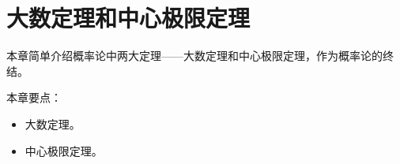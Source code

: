 \chapter{大数定理和中心极限定理}

本章简单介绍概率论中两大定理——大数定理和中心极限定理，作为概率论的终结。

本章要点：
\begin{itemize}
    \item 大数定理。
    \item 中心极限定理。
\end{itemize}

\newpage


\newpage


\newpage





